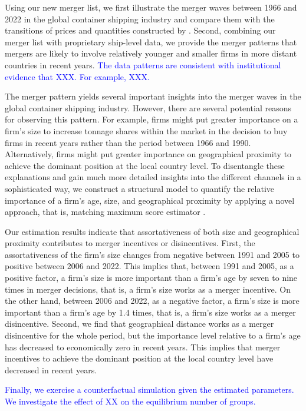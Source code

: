 \documentclass[10pt]{article}
\begin{document}
Using our new merger list, we first illustrate the merger waves between 1966 and 2022 in the global container shipping industry and compare them with the transitions of prices and quantities constructed by \cite{matsuda2022unified}. Second, combining our merger list with proprietary ship-level data, we provide the merger patterns that mergers are likely to involve relatively younger and smaller firms in more distant countries in recent years. 
\textcolor{blue}{The data patterns are consistent with institutional evidence that XXX. For example, XXX.}

The merger pattern yields several important insights into the merger waves in the global container shipping industry. 
However, there are several potential reasons for observing this pattern. 
For example, firms might put greater importance on a firm's size to increase tonnage shares within the market in the decision to buy firms in recent years rather than the period between 1966 and 1990. 
Alternatively, firms might put greater importance on geographical proximity to achieve the dominant position at the local country level. 
To disentangle these explanations and gain much more detailed insights into the different channels in a sophisticated way, we construct a structural model to quantify the relative importance of a firm's age, size, and geographical proximity by applying a novel approach, that is, matching maximum score estimator \cite{fox2018qe}. 

Our estimation results indicate that assortativeness of both size and geographical proximity contributes to merger incentives or disincentives. 
First, the assortativeness of the firm's size changes from negative between 1991 and 2005 to positive between 2006 and 2022. 
This implies that, between 1991 and 2005, as a positive factor, a firm's size is more important than a firm's age by seven to nine times in merger decisions, that is, a firm's size works as a merger incentive.
On the other hand, between 2006 and 2022, as a negative factor, a firm's size is more important than a firm's age by 1.4 times, that is, a firm's size works as a merger disincentive.
Second, we find that geographical distance works as a merger disincentive for the whole period, but the importance level relative to a firm's age has decreased to economically zero in recent years. 
This implies that merger incentives to achieve the dominant position at the local country level have decreased in recent years.

\textcolor{blue}{Finally, we exercise a counterfactual simulation given the estimated parameters. 
We investigate the effect of XX on the equilibrium number of groups. }
\end{document}
